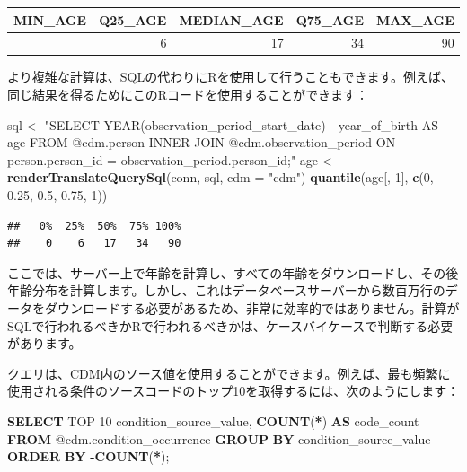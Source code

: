 \documentclass[
  11pt]{book}
\newenvironment{Shaded}{\begin{snugshade}}{\end{snugshade}}
\newcommand{\AttributeTok}[1]{\textcolor[rgb]{0.13,0.29,0.53}{#1}}
\newcommand{\DecValTok}[1]{\textcolor[rgb]{0.00,0.00,0.81}{#1}}
\newcommand{\FloatTok}[1]{\textcolor[rgb]{0.00,0.00,0.81}{#1}}
\newcommand{\FunctionTok}[1]{\textcolor[rgb]{0.13,0.29,0.53}{\textbf{#1}}}
\newcommand{\KeywordTok}[1]{\textcolor[rgb]{0.13,0.29,0.53}{\textbf{#1}}}
\newcommand{\NormalTok}[1]{#1}
\newcommand{\OperatorTok}[1]{\textcolor[rgb]{0.81,0.36,0.00}{\textbf{#1}}}
\newcommand{\OtherTok}[1]{\textcolor[rgb]{0.56,0.35,0.01}{#1}}
\newcommand{\StringTok}[1]{\textcolor[rgb]{0.31,0.60,0.02}{#1}}
\theoremstyle{definition}
\theoremstyle{definition}
\theoremstyle{definition}
\theoremstyle{definition}
\theoremstyle{remark}
\begin{document}
\begin{longtable}[]{@{}rrrrr@{}}
\toprule\noalign{}
MIN\_AGE & Q25\_AGE & MEDIAN\_AGE & Q75\_AGE & MAX\_AGE \\
\midrule\noalign{}
\endhead
\bottomrule\noalign{}
\endlastfoot
0 & 6 & 17 & 34 & 90 \\
\end{longtable}

より複雑な計算は、SQLの代わりにRを使用して行うこともできます。例えば、同じ結果を得るためにこのRコードを使用することができます：

\begin{Shaded}
\begin{Highlighting}[]
\NormalTok{sql }\OtherTok{\textless{}{-}} \StringTok{"SELECT YEAR(observation\_period\_start\_date) {-}}
\StringTok{               year\_of\_birth AS age}
\StringTok{FROM @cdm.person}
\StringTok{INNER JOIN @cdm.observation\_period}
\StringTok{  ON person.person\_id = observation\_period.person\_id;"}
\NormalTok{age }\OtherTok{\textless{}{-}} \FunctionTok{renderTranslateQuerySql}\NormalTok{(conn, sql, }\AttributeTok{cdm =} \StringTok{"cdm"}\NormalTok{)}
\FunctionTok{quantile}\NormalTok{(age[, }\DecValTok{1}\NormalTok{], }\FunctionTok{c}\NormalTok{(}\DecValTok{0}\NormalTok{, }\FloatTok{0.25}\NormalTok{, }\FloatTok{0.5}\NormalTok{, }\FloatTok{0.75}\NormalTok{, }\DecValTok{1}\NormalTok{))}
\end{Highlighting}
\end{Shaded}

\begin{verbatim}
##   0%  25%  50%  75% 100%
##    0    6   17   34   90
\end{verbatim}

ここでは、サーバー上で年齢を計算し、すべての年齢をダウンロードし、その後年齢分布を計算します。しかし、これはデータベースサーバーから数百万行のデータをダウンロードする必要があるため、非常に効率的ではありません。計算がSQLで行われるべきかRで行われるべきかは、ケースバイケースで判断する必要があります。

クエリは、CDM内のソース値を使用することができます。例えば、最も頻繁に使用される条件のソースコードのトップ10を取得するには、次のようにします：

\begin{Shaded}
\begin{Highlighting}[]
\KeywordTok{SELECT}\NormalTok{ TOP }\DecValTok{10}\NormalTok{ condition\_source\_value,}
  \FunctionTok{COUNT}\NormalTok{(}\OperatorTok{*}\NormalTok{) }\KeywordTok{AS}\NormalTok{ code\_count}
\KeywordTok{FROM}\NormalTok{ @cdm.condition\_occurrence}
\KeywordTok{GROUP} \KeywordTok{BY}\NormalTok{ condition\_source\_value}
\KeywordTok{ORDER} \KeywordTok{BY} \OperatorTok{{-}}\FunctionTok{COUNT}\NormalTok{(}\OperatorTok{*}\NormalTok{);}
\end{Highlighting}
\end{Shaded}
\end{document}
